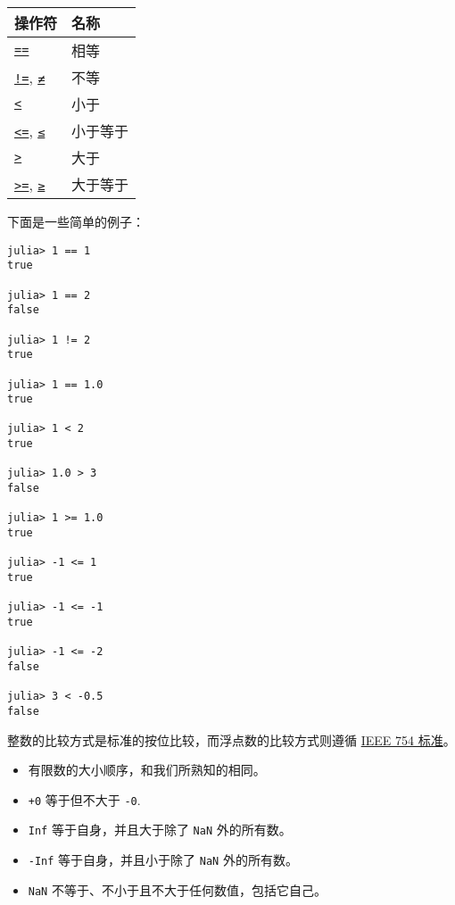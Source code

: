 \begin{table}[h]

\begin{tabulary}{\linewidth}{|L|L|}
\hline
操作符 & 名称 \\
\hline
\hyperlink{15143149452920304570}{\texttt{==}} & 相等 \\
\hline
\hyperlink{3046079188653285114}{\texttt{!=}}, \hyperlink{3046079188653285114}{\texttt{≠}} & 不等 \\
\hline
\hyperlink{702782232449268329}{\texttt{<}} & 小于 \\
\hline
\hyperlink{11411050964021316526}{\texttt{<=}}, \hyperlink{11411050964021316526}{\texttt{≤}} & 小于等于 \\
\hline
\hyperlink{8677991761303191103}{\texttt{>}} & 大于 \\
\hline
\hyperlink{7019639580556993898}{\texttt{>=}}, \hyperlink{7019639580556993898}{\texttt{≥}} & 大于等于 \\
\hline
\end{tabulary}

\end{table}



下面是一些简单的例子：




\begin{verbatim}
julia> 1 == 1
true

julia> 1 == 2
false

julia> 1 != 2
true

julia> 1 == 1.0
true

julia> 1 < 2
true

julia> 1.0 > 3
false

julia> 1 >= 1.0
true

julia> -1 <= 1
true

julia> -1 <= -1
true

julia> -1 <= -2
false

julia> 3 < -0.5
false
\end{verbatim}



整数的比较方式是标准的按位比较，而浮点数的比较方式则遵循 \href{https://en.wikipedia.org/wiki/IEEE\_754-2008}{IEEE 754 标准}。



\begin{itemize}
\item 有限数的大小顺序，和我们所熟知的相同。


\item \texttt{+0} 等于但不大于 \texttt{-0}.


\item \texttt{Inf} 等于自身，并且大于除了 \texttt{NaN} 外的所有数。


\item \texttt{-Inf} 等于自身，并且小于除了 \texttt{NaN} 外的所有数。


\item \texttt{NaN} 不等于、不小于且不大于任何数值，包括它自己。

\end{itemize}


